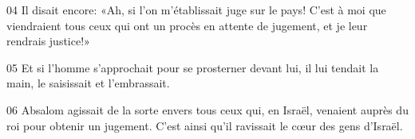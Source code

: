 
04 Il disait encore: «Ah, si l’on m’établissait juge sur le pays! C’est à moi que viendraient tous ceux qui ont un procès en attente de jugement, et je leur rendrais justice!»

05 Et si l’homme s’approchait pour se prosterner devant lui, il lui tendait la main, le saisissait et l’embrassait.

06 Absalom agissait de la sorte envers tous ceux qui, en Israël, venaient auprès du roi pour obtenir un jugement. C’est ainsi qu’il ravissait le cœur des gens d’Israël.
